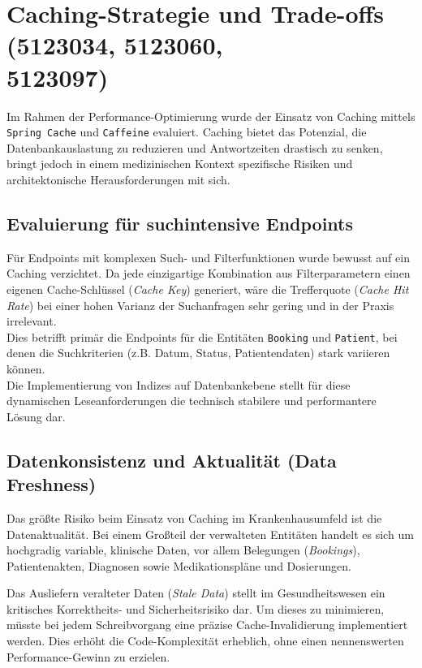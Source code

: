 \section{Caching-Strategie und Trade-offs (5123034, 5123060, \\5123097)}
Im Rahmen der Performance-Optimierung wurde der Einsatz von Caching mittels \texttt{Spring Cache} und \texttt{Caffeine} evaluiert. 
Caching bietet das Potenzial, die Datenbankauslastung zu reduzieren und Antwortzeiten drastisch zu senken, bringt jedoch in einem medizinischen Kontext spezifische Risiken und architektonische Herausforderungen mit sich.

\subsection{Evaluierung für suchintensive Endpoints}
Für Endpoints mit komplexen Such- und Filterfunktionen wurde bewusst auf ein Caching verzichtet. 
Da jede einzigartige Kombination aus Filterparametern einen eigenen Cache-Schlüssel (\textit{Cache Key}) generiert, wäre die Trefferquote (\textit{Cache Hit Rate}) bei einer hohen Varianz der Suchanfragen sehr gering und in der Praxis irrelevant. \\
Dies betrifft primär die Endpoints für die Entitäten \texttt{Booking} und \texttt{Patient}, bei denen die Suchkriterien (z.B. Datum, Status, Patientendaten) stark variieren können.\\
Die Implementierung von Indizes auf Datenbankebene stellt für diese dynamischen Leseanforderungen die technisch stabilere und performantere Lösung dar.
\subsection{Datenkonsistenz und Aktualität (Data Freshness)}
Das größte Risiko beim Einsatz von Caching im Krankenhausumfeld ist die Datenaktualität. 
Bei einem Großteil der verwalteten Entitäten handelt es sich um hochgradig variable, klinische Daten, vor allem Belegungen (\textit{Bookings}), Patientenakten, Diagnosen sowie Medikationspläne und Dosierungen. 

Das Ausliefern veralteter Daten (\textit{Stale Data}) stellt im Gesundheitswesen ein kritisches Korrektheits- und Sicherheitsrisiko dar. 
Um dieses zu minimieren, müsste bei jedem Schreibvorgang eine präzise Cache-Invalidierung implementiert werden. Dies erhöht die Code-Komplexität erheblich, ohne einen nennenswerten Performance-Gewinn zu erzielen.


